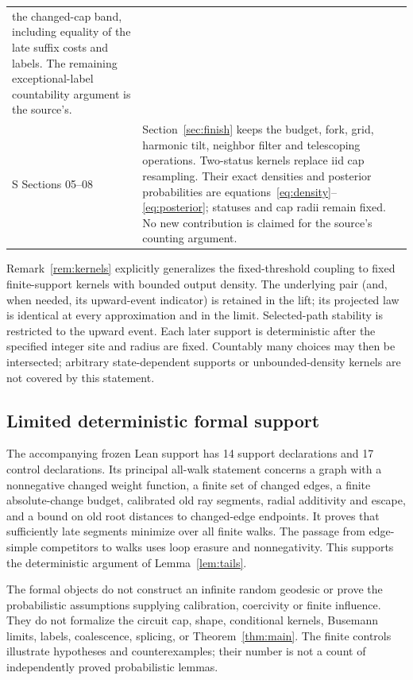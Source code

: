 \begin{longtable}{@{}>{\raggedright\arraybackslash}p{}>{\raggedright\arraybackslash}p{}@{}}
the changed-cap band, including equality of the late suffix costs and labels.
The remaining exceptional-label countability argument is the source's.\\
S Sections 05--08 & Section~\ref{sec:finish} keeps the budget, fork, grid,
harmonic tilt, neighbor filter and telescoping operations. Two-status kernels
replace iid cap resampling. Their exact densities and posterior probabilities
are equations~\eqref{eq:density}--\eqref{eq:posterior}; statuses and cap radii
remain fixed. No new contribution is claimed for the source's counting argument.\\
\bottomrule
\end{longtable}

Remark~\ref{rem:kernels} explicitly generalizes the fixed-threshold coupling
to fixed finite-support kernels with bounded output density. The underlying
pair (and, when needed, its upward-event indicator) is retained in the lift;
its projected law is identical at every approximation and in the limit.
Selected-path stability is restricted to the upward event. Each later support
is deterministic after the specified integer site and radius are fixed.
Countably many choices may then be intersected; arbitrary state-dependent
supports or unbounded-density kernels are not covered by this statement.

\subsection{Limited deterministic formal support}
The accompanying frozen Lean support has 14 support declarations and 17 control
declarations. Its principal all-walk statement concerns a graph with a
nonnegative changed weight function, a finite set of changed edges, a finite
absolute-change budget, calibrated old ray segments, radial additivity and
escape, and a bound on old root distances to changed-edge endpoints. It proves
that sufficiently late segments minimize over all finite walks. The passage
from edge-simple competitors to walks uses loop erasure and nonnegativity.
This supports the deterministic argument of Lemma~\ref{lem:tails}.

The formal objects do not construct an infinite random geodesic or prove the
probabilistic assumptions supplying calibration, coercivity or finite
influence. They do not formalize the circuit cap, shape, conditional kernels,
Busemann limits, labels, coalescence, splicing, or Theorem~\ref{thm:main}.
The finite controls illustrate hypotheses and counterexamples; their number
is not a count of independently proved probabilistic lemmas.

